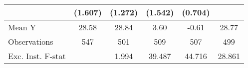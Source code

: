 {\begin{tabular}{l*{5}{c}}
            &     (1.607)         &     (1.272)         &     (1.542)         &     (0.704)         &                     \\
\midrule
Mean Y      &       28.58         &       28.84         &        3.60         &       -0.61         &       28.77         \\
Observations&         547         &         501         &         509         &         507         &         499         \\
Exc. Inst. F-stat&                     &       1.994         &      39.487         &      44.716         &      28.861         \\
\bottomrule
\end{tabular}
}
